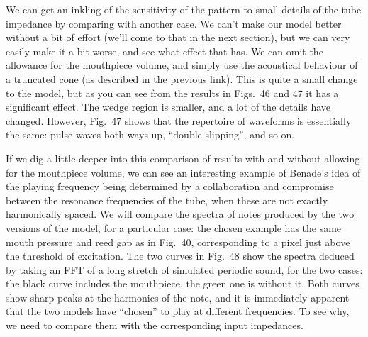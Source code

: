   We can get an inkling of the sensitivity of the pattern to small details of 
  the tube impedance by comparing with another case. We can’t make our model 
  better without a bit of effort (we'll come to that in the next section), but 
  we can very easily make it a bit worse, and see what effect that has. We can 
  omit the allowance for the mouthpiece volume, and simply use the acoustical 
  behaviour of a truncated cone (as described in the previous link). This is 
  quite a small change to the model, but as you can see from the results in 
  Figs.\ 46 and 47 it has a significant effect. The wedge region is smaller, 
  and a lot of the details have changed. However, Fig.\ 47 shows that the 
  repertoire of waveforms is essentially the same: pulse waves both ways up, 
  “double slipping”, and so on. 



  If we dig a little deeper into this comparison of results with and without 
  allowing for the mouthpiece volume, we can see an interesting example of 
  Benade’s idea of the playing frequency being determined by a collaboration 
  and compromise between the resonance frequencies of the tube, when these are 
  not exactly harmonically spaced. We will compare the spectra of notes 
  produced by the two versions of the model, for a particular case: the chosen 
  example has the same mouth pressure and reed gap as in Fig.\ 40, 
  corresponding to a pixel just above the threshold of excitation. The two 
  curves in Fig.\ 48 show the spectra deduced by taking an FFT of a long 
  stretch of simulated periodic sound, for the two cases: the black curve 
  includes the mouthpiece, the green one is without it. Both curves show sharp 
  peaks at the harmonics of the note, and it is immediately apparent that the 
  two models have ``chosen'' to play at different frequencies. To see why, we 
  need to compare them with the corresponding input impedances. 

